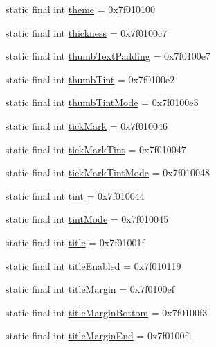 \begin{CompactItemize}
static final int \hyperlink{classandroid_1_1support_1_1fragment_1_1_r_1_1attr_c2b861150a6e68e7c98a5033df259cfb}{theme} = 0x7f010100
\item 
static final int \hyperlink{classandroid_1_1support_1_1fragment_1_1_r_1_1attr_83fff6be29b9da64eb7cf2dc55034973}{thickness} = 0x7f0100c7
\item 
static final int \hyperlink{classandroid_1_1support_1_1fragment_1_1_r_1_1attr_1605da962b67872f5e2b7294afbb8c13}{thumbTextPadding} = 0x7f0100e7
\item 
static final int \hyperlink{classandroid_1_1support_1_1fragment_1_1_r_1_1attr_8d288b4e4b38bce8cb8b6e968d67b924}{thumbTint} = 0x7f0100e2
\item 
static final int \hyperlink{classandroid_1_1support_1_1fragment_1_1_r_1_1attr_fa5bfae6ed4b91c925349a2c3876db06}{thumbTintMode} = 0x7f0100e3
\item 
static final int \hyperlink{classandroid_1_1support_1_1fragment_1_1_r_1_1attr_4b36f683fab310e1f59505a3a8cb5f0c}{tickMark} = 0x7f010046
\item 
static final int \hyperlink{classandroid_1_1support_1_1fragment_1_1_r_1_1attr_85e88f020a01b8c4ff1a0ec1e9c811eb}{tickMarkTint} = 0x7f010047
\item 
static final int \hyperlink{classandroid_1_1support_1_1fragment_1_1_r_1_1attr_0417e5a71e1b216da17a819ba411bdae}{tickMarkTintMode} = 0x7f010048
\item 
static final int \hyperlink{classandroid_1_1support_1_1fragment_1_1_r_1_1attr_cdfc05ebdb3d08c2ddb0a51b7fa14488}{tint} = 0x7f010044
\item 
static final int \hyperlink{classandroid_1_1support_1_1fragment_1_1_r_1_1attr_b2b6b80b89a91fca56c9ed93a03f2f48}{tintMode} = 0x7f010045
\item 
static final int \hyperlink{classandroid_1_1support_1_1fragment_1_1_r_1_1attr_e8d26cb8bebf67cfbd88106f6012c608}{title} = 0x7f01001f
\item 
static final int \hyperlink{classandroid_1_1support_1_1fragment_1_1_r_1_1attr_59035ce205dbacf1265646d37aa42055}{titleEnabled} = 0x7f010119
\item 
static final int \hyperlink{classandroid_1_1support_1_1fragment_1_1_r_1_1attr_a21d87784a7eaeb6c26b96eda7b2aecd}{titleMargin} = 0x7f0100ef
\item 
static final int \hyperlink{classandroid_1_1support_1_1fragment_1_1_r_1_1attr_c45d5d0d89c9c99926a853e620fb1501}{titleMarginBottom} = 0x7f0100f3
\item 
static final int \hyperlink{classandroid_1_1support_1_1fragment_1_1_r_1_1attr_5fe187685d2ce26b830a1d5f0a8dcdee}{titleMarginEnd} = 0x7f0100f1

\end{CompactItemize}
